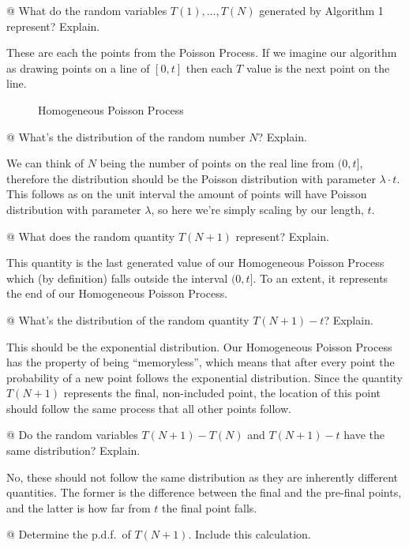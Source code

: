 \documentclass[10pt]{article}
\begin{document}
\begin{easylist}[enumerate]
    @ What do the random variables $T(1), \ldots, T(N)$ generated by Algorithm 1
    represent? Explain.

    \p These are each the points from the Poisson Process. If we imagine our
    algorithm as drawing points on a line of $[0,t]$ then each $T$ value is the
    next point on the line.

    \begin{figure}[H]
        \centering
        \caption{Homogeneous Poisson Process}
    \end{figure}

    @ What's the distribution of the random number $N$? Explain.

    \p We can think of $N$ being the number of points on the real line from
    $(0,t]$, therefore the distribution should be the Poisson distribution with
    parameter $\lambda \cdot t$. This follows as on the unit interval the amount
    of points will have Poisson distribution with parameter $\lambda$, so here
    we're simply scaling by our length, $t$.

    @ What does the random quantity $T(N + 1)$ represent? Explain.

    \p This quantity is the last generated value of our Homogeneous Poisson
    Process which (by definition) falls outside the interval $(0,t]$. To an
    extent, it represents the end of our Homogeneous Poisson Process.

    @ What's the distribution of the random quantity $T(N + 1) - t$? Explain.

    \p This should be the exponential distribution. Our Homogeneous Poisson
    Process has the property of being ``memoryless'', which means that after
    every point the probability of a new point follows the exponential
    distribution. Since the quantity $T(N+1)$ represents the final, non-included
    point, the location of this point should follow the same process that all
    other points follow.

    @ Do the random variables $T(N + 1) - T(N)$ and $T(N + 1) - t$ have the same
    distribution? Explain.

    \p No, these should not follow the same distribution as they are inherently
    different quantities. The former is the difference between the final and the
    pre-final points, and the latter is how far from $t$ the final point falls.

    @ Determine the p.d.f.\ of $T(N + 1)$. Include this calculation.


\end{easylist}
\end{document}
